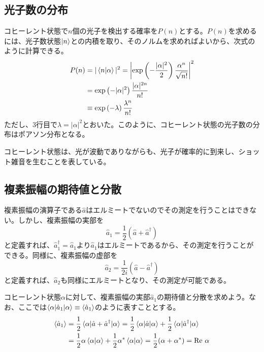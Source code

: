 \subsection{光子数の分布}
コヒーレント状態で$n$個の光子を検出する確率を$P(n)$とする。$P(n)$を求めるには、光子数状態$\ket n$との内積を取り、そのノルムを求めればよいから、次式のように計算できる。
\begin{equation}
\begin{aligned}
  P(n) &= |\braket {n | \alpha}|^2 = \left| \exp\left(-\frac{|\alpha|^2}{2}\right) \frac{\alpha^n}{\sqrt{n!}}\right|^2\\
  &= \exp \left(-|\alpha|^{2}\right)\frac{|\alpha|^{2n}}{n!}\\
  &\equiv \exp \left(-\lambda\right)\frac{\lambda^n}{n!}
\end{aligned}
\end{equation}
ただし、3行目で$\lambda = |\alpha|^2$とおいた。このように、コヒーレント状態の光子数の分布はポアソン分布となる。

コヒーレント状態は、光が波動でありながらも、光子が確率的に到来し、ショット雑音を生むことを表している。

\subsection{複素振幅の期待値と分散}
複素振幅の演算子である$\hat a$はエルミートでないのでその測定を行うことはできない。しかし、複素振幅の実部を
\begin{equation}
  \hat a_1 = \frac 1 2 (\hat a + \hat a^\dagger)
\end{equation}
と定義すれば、$\hat a_1^\dagger = \hat a_1$より$\hat a_1$はエルミートであるから、その測定を行うことができる。同様に、複素振幅の虚部を
\begin{equation}
  \hat a_2 = \frac 1 {2i} (\hat a - \hat a^\dagger)
\end{equation}
と定義すれば、$\hat a_2$も同様にエルミートとなり、その測定が可能である。

コヒーレント状態$\alpha$に対して、複素振幅の実部$\hat a_1$の期待値と分散を求めよう。なお、ここでは$\braket{\alpha|\hat a_1|\alpha} \equiv \braket{\hat a_1}$のように表すこととする。
\begin{equation}
\begin{aligned}
  \braket{\hat a_1} &= \frac{1}{2}\braket{\alpha|\hat a + \hat a^\dagger|\alpha} = \frac{1}{2}\braket{\alpha|\hat a |\alpha} + \frac{1}{2}\braket{\alpha|\hat a^\dagger |\alpha}\\
  &= \frac{1}{2}\alpha \braket{\alpha|\alpha} + \frac{1}{2} \alpha^* \braket{\alpha|\alpha} = \frac 1 2 (\alpha + \alpha^*) = \mathrm{Re} \ \alpha
\end{aligned}
\end{equation}

